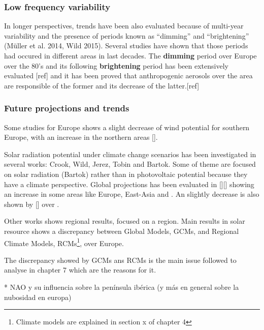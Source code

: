 \subsubsection{Low frequency variability}

In longer perspectives, trends have been also evaluated because of multi-year variability and the presence of periods known as “dimming” and “brightening” (Müller et al. 2014, Wild 2015). Several studies have shown that those periods had occured in different areas in last decades. The \textbf{dimming} period over Europe over the 80's and its following \textbf{brightening} period has been extensively evaluated [ref] and it has been proved that anthropogenic aerosols over the area are responsible of the former and its decrease of the latter.[ref]
 


\subsubsection{Future projections and trends}
Some studies for Europe shows a slight decrease of wind potential for southern Europe, with an increase in the northern areas [].

Solar radiation potential under climate change scenarios has been investigated in several works: Crook, Wild, Jerez, Tobin and Bartok. Some of theme are focused on solar radiation (Bartok) rather than in photovoltaic potential because they have a climate perspective. Global projections has been evaluated in [][] showing an increase in some areas like Europe, East-Asia and . An slightly decrease is also shown by [] over .

Other works shows regional results, focused on a region. Main results in solar resource shows a discrepancy between Global Models, GCMs, and Regional Climate Models, RCMs\footnote{Climate models are explained in section x of chapter 4}, over Europe.

The discrepancy showed by GCMs ans RCMs is the main issue followed to analyse in chapter 7 which are the reasons for it.

{\color{red} * NAO y su influencia sobre la península ibérica (y más en general sobre la nubosidad en europa)}
% 